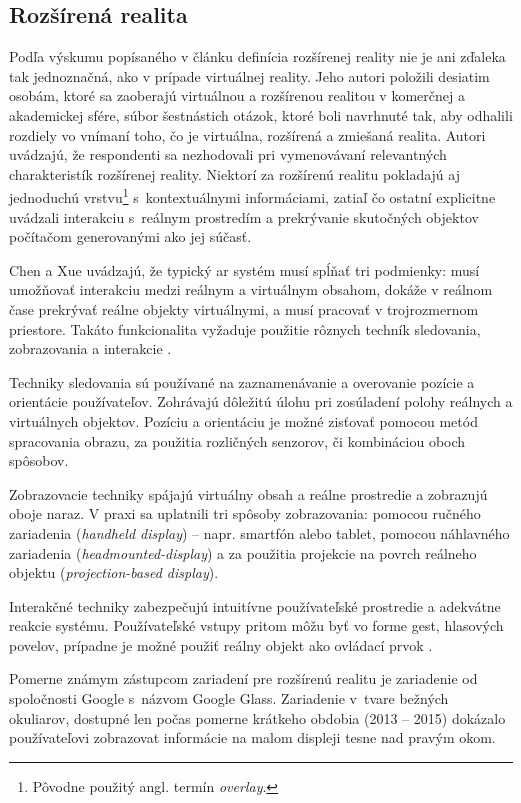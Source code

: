 \subsection{Rozšírená realita}
Podľa výskumu popísaného v článku \cite{speicherWhatMixedReality2019a} definícia rozšírenej reality nie je ani zďaleka tak jednoznačná, ako v prípade virtuálnej reality. 
Jeho autori položili desiatim osobám, ktoré sa zaoberajú virtuálnou a rozšírenou realitou v komerčnej a akademickej sfére, súbor šestnástich otázok, ktoré boli 
navrhnuté tak, aby odhalili rozdiely vo vnímaní toho, čo je virtuálna, rozšírená a zmiešaná realita. Autori uvádzajú, že respondenti sa nezhodovali pri vymenovávaní
relevantných charakteristík rozšírenej reality. Niektorí za rozšírenú realitu pokladajú aj jednoduchú vrstvu\footnote{Pôvodne použitý angl. termín \emph{overlay}.} 
s~kontextuálnymi informáciami, zatiaľ čo ostatní explicitne uvádzali interakciu s~reálnym prostredím a prekrývanie skutočných objektov počítačom generovanými 
ako jej súčasť.

Chen a Xue uvádzajú, že typický \acrshort{ar} systém musí spĺňať tri podmienky: musí umožňovať interakciu medzi reálnym a virtuálnym obsahom, dokáže v reálnom čase 
prekrývať reálne objekty virtuálnymi, a musí pracovať v trojrozmernom priestore. Takáto funkcionalita vyžaduje použitie rôznych techník sledovania, zobrazovania a
interakcie \cite{chenRenaissanceAugmentedReality2022}.

Techniky sledovania sú používané na zaznamenávanie a overovanie pozície a orientácie používateľov. Zohrávajú dôležitú úlohu pri zosúladení polohy reálnych a virtuálnych
objektov. Pozíciu a orientáciu je možné zisťovať pomocou metód spracovania obrazu, za použitia rozličných senzorov, či kombináciou oboch spôsobov.

Zobrazovacie techniky spájajú virtuálny obsah a reálne prostredie a zobrazujú oboje naraz. V praxi sa uplatnili tri spôsoby zobrazovania: pomocou ručného zariadenia 
(\emph{handheld display}) {--} napr. smartfón alebo tablet, pomocou náhlavného zariadenia (\emph{headmounted-display}) a za použitia projekcie na povrch reálneho objektu 
(\emph{projection-based display}).

Interakčné techniky zabezpečujú intuitívne používateľské prostredie a adekvátne reakcie systému. Používateľské vstupy pritom môžu byť vo forme gest, hlasových povelov,
prípadne je možné použiť reálny objekt ako ovládací prvok \cite{chenRenaissanceAugmentedReality2022}.

Pomerne známym zástupcom zariadení pre rozšírenú realitu je zariadenie od spoločnosti Google s~názvom Google Glass. Zariadenie v~tvare bežných 
okuliarov, dostupné len počas pomerne krátkeho obdobia (2013 {--} 2015) \cite{brighamRealityCheckBasics2017} dokázalo používateľovi zobrazovat informácie na malom displeji tesne
nad pravým okom. 

